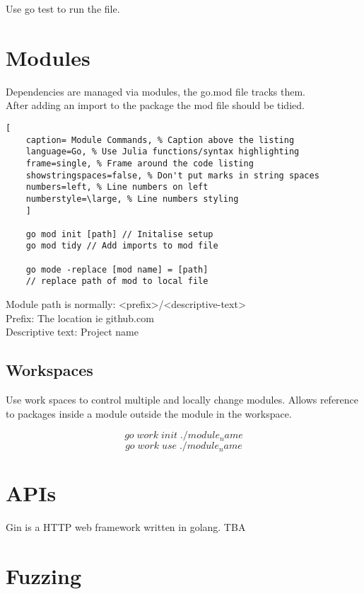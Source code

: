 \documentclass[11pt]{scrartcl} %
\begin{document}
Use go test to run the file.

\section{Modules}

Dependencies are managed via modules, the go.mod file tracks them.\\

After adding an import to the package the mod file should be tidied.

\begin{lstlisting}[
	caption= Module Commands, % Caption above the listing
	language=Go, % Use Julia functions/syntax highlighting
	frame=single, % Frame around the code listing
	showstringspaces=false, % Don't put marks in string spaces
	numbers=left, % Line numbers on left
	numberstyle=\large, % Line numbers styling
	]

	go mod init [path] // Initalise setup
	go mod tidy // Add imports to mod file

	go mode -replace [mod name] = [path]
	// replace path of mod to local file

\end{lstlisting}

Module path is normally: <prefix>/<descriptive-text> \\

Prefix: The location ie github.com \\
Descriptive text: Project name

\subsection{Workspaces}

Use work spaces to control multiple and locally change modules. Allows reference to packages inside a module
outside the module in the workspace.

\[ go\;work\;init\; ./module_name \]
\[ go\;work\;use\; ./module_name \]

\section{APIs}

Gin is a HTTP web framework written in golang. TBA

\section{Fuzzing}
\end{document}

